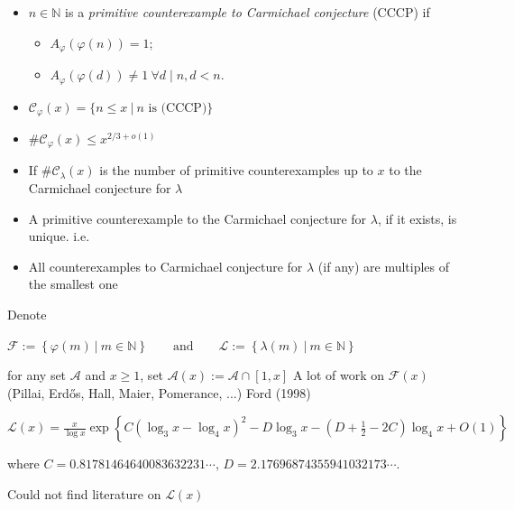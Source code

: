 \documentclass[landscape]{powersem} %
\newcommand{\N}{{\mathbb N}}
\newcommand{\manorossa}{\textcolor{conceptcolor}{\ding{43}}}
\newcommand{\matitablu}{\textcolor{MidnightBlue}{\ding{46}}}
\newcommand{\heading}[1]{%
 \begin{center}
  \large\bf
  \shadowbox{{\textcolor{conceptcolor}{#1}}}%
 \end{center}
 \vspace{1ex minus 1ex}}
\begin{document}
\begin{slide}
\heading{Carmichael Conjecture for $\lambda$\qquad (2/2)}\pause

\begin{itemize}
\item[\manorossa] $n\in\N$ is a {\it primitive
counterexample to Carmichael conjecture}  (CCCP) if\pause
\begin{itemize}
\item[\matitablu] $A_\varphi(\varphi(n))=1$;\pause
\item[\matitablu] $A_\varphi(\varphi(d))\neq 1\ \forall d\mid n, d<n.$\pause
\end{itemize}
\item[\manorossa] $\mathcal C_\varphi(x)=\{n\leq x\ |\ n \text{ is (CCCP)}\}$\pause

\item[\manorossa] $\#\mathcal C_\varphi(x)\le x^{2/3+o(1)}$\pause

\item[\manorossa] If $\#\mathcal C_\lambda(x)$ is the number of primitive
counterexamples up to $x$ to the  Carmichael conjecture for $\lambda$\pause

\item[\manorossa] A primitive counterexample to the Carmichael conjecture for $\lambda$,
if it exists, is unique. i.e.\pause
\centerline{}\pause

\item[\manorossa] All counterexamples to Carmichael conjecture for $\lambda$
(if any) are multiples of the smallest one
\end{itemize}
\end{slide}

\begin{slide}
\heading{Image of $\varphi$}\pause

\manorossa Denote
 \centerline{$\displaystyle{\mathcal F:=\left\{\varphi(m)\ |\ m\in\N\right\}\qquad\text{and}
 \qquad\mathcal L:=\left\{\lambda(m)\ |\ m\in\N\right\}}$}\pause
\manorossa for any set $\mathcal A$ and $x\geq1$, set $\displaystyle{\mathcal A(x):=\mathcal A\cap[1,x]}$\pause
\manorossa A lot of work on  $\mathcal F(x)$ (Pillai, Erd\H os, Hall, Maier, Pomerance, ...)\pause
\manorossa \textcolor{OliveGreen}{Ford} (1998)\pause
\bigskip
\centerline{$\displaystyle{\mathcal L(x)=\frac x{\log x}\exp\left\{ C(\log_3 x-\log_4 x)^2 - D\log_3 x-(D+\frac12-2C)\log_4 x+O(1)\right\}}$}
\pause
where $C=0.81781464640083632231\cdots$, $D=2.17696874355941032173\cdots$.\pause\medskip

\manorossa Could not find literature on $\mathcal L(x)$

\end{slide}
\end{document}
